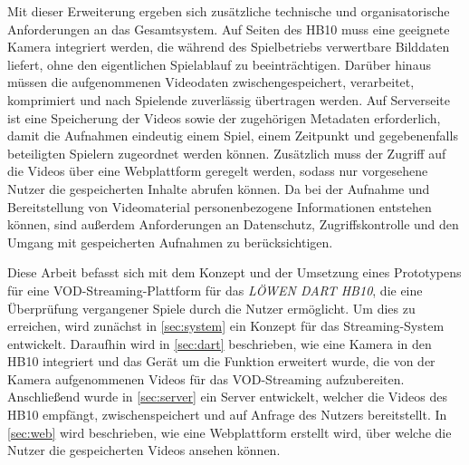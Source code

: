 Mit dieser Erweiterung ergeben sich zusätzliche technische und organisatorische Anforderungen an das Gesamtsystem. Auf Seiten des HB10 muss eine geeignete Kamera integriert werden, die während des Spielbetriebs verwertbare Bilddaten liefert, ohne den eigentlichen Spielablauf zu beeinträchtigen. 
Darüber hinaus müssen die aufgenommenen Videodaten zwischengespeichert, verarbeitet, komprimiert und nach Spielende zuverlässig übertragen werden. Auf Serverseite ist eine Speicherung der Videos sowie der zugehörigen Metadaten erforderlich, damit die Aufnahmen eindeutig einem Spiel, 
einem Zeitpunkt und gegebenenfalls beteiligten Spielern zugeordnet werden können. Zusätzlich muss der Zugriff auf die Videos über eine Webplattform geregelt werden, sodass nur vorgesehene Nutzer die gespeicherten Inhalte abrufen können. 
Da bei der Aufnahme und Bereitstellung von Videomaterial personenbezogene Informationen entstehen können, sind außerdem Anforderungen an Datenschutz, Zugriffskontrolle und den Umgang mit gespeicherten Aufnahmen zu berücksichtigen.

Diese Arbeit befasst sich mit dem Konzept und der Umsetzung eines Prototypens für eine \ac{VOD}-Streaming-Plattform für das \textit{LÖWEN DART HB10}, 
die eine Überprüfung vergangener Spiele durch die Nutzer ermöglicht. Um dies zu erreichen, wird zunächst in \cref{sec:system} ein Konzept für das Streaming-System entwickelt. Daraufhin wird in \cref{sec:dart} beschrieben, wie eine Kamera in den HB10 integriert und das Gerät um die Funktion erweitert wurde, 
die von der Kamera aufgenommenen Videos für das \ac{VOD}-Streaming aufzubereiten. Anschließend wurde in \cref{sec:server} ein Server entwickelt, welcher die Videos des HB10 empfängt, zwischenspeichert und auf Anfrage des Nutzers bereitstellt. In \cref{sec:web} wird beschrieben, 
wie eine Webplattform erstellt wird, über welche die Nutzer die gespeicherten Videos ansehen können.

\newpage
